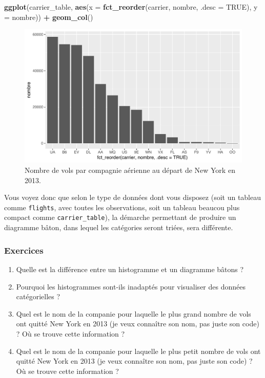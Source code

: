 \documentclass[a4paperpaper,]{article}
\newenvironment{Shaded}{\begin{snugshade}}{\end{snugshade}}
\newcommand{\KeywordTok}[1]{\textcolor[rgb]{0.13,0.29,0.53}{\textbf{#1}}}
\newcommand{\DataTypeTok}[1]{\textcolor[rgb]{0.13,0.29,0.53}{#1}}
\newcommand{\StringTok}[1]{\textcolor[rgb]{0.31,0.60,0.02}{#1}}
\newcommand{\OtherTok}[1]{\textcolor[rgb]{0.56,0.35,0.01}{#1}}
\newcommand{\OperatorTok}[1]{\textcolor[rgb]{0.81,0.36,0.00}{\textbf{#1}}}
\newcommand{\NormalTok}[1]{#1}
\providecommand{\tightlist}{%
  \setlength{\itemsep}{0pt}\setlength{\parskip}{0pt}}
\theoremstyle{definition}
\theoremstyle{definition}
\theoremstyle{definition}
\theoremstyle{remark}
\begin{document}
\begin{Shaded}
\begin{Highlighting}[]
\KeywordTok{ggplot}\NormalTok{(carrier_table, }\KeywordTok{aes}\NormalTok{(}\DataTypeTok{x =} \KeywordTok{fct_reorder}\NormalTok{(carrier, nombre, }\DataTypeTok{.desc =} \OtherTok{TRUE}\NormalTok{), }\DataTypeTok{y =}\NormalTok{ nombre)) }\OperatorTok{+}
\StringTok{  }\KeywordTok{geom_col}\NormalTok{()}
\end{Highlighting}
\end{Shaded}

\begin{figure}[htpb]

{\centering \includegraphics[width=0.9\linewidth]{figure/bpcarriersortedcol-1} 

}

\caption{Nombre de vols par compagnie aérienne au départ de New York en 2013.}\label{fig:bpcarriersortedcol}
\end{figure}

Vous voyez donc que selon le type de données dont vous disposez (soit un
tableau comme \texttt{flights}, avec toutes les observations, soit un
tableau beaucou plus compact comme \texttt{carrier\_table}), la démarche
permettant de produire un diagramme bâton, dans lequel les catégories
seront triées, sera différente.

\subsubsection{Exercices}\label{exercices-5}

\begin{enumerate}
\def\labelenumi{\arabic{enumi}.}
\tightlist
\item
  Quelle est la différence entre un histogramme et un diagramme bâtons ?
\item
  Pourquoi les histogrammes sont-ils inadaptés pour visualiser des
  données catégorielles ?
\item
  Quel est le nom de la companie pour laquelle le plus grand nombre de
  vols ont quitté New York en 2013 (je veux connaître son nom, pas juste
  son code) ? Où se trouve cette information ?
\item
  Quel est le nom de la companie pour laquelle le plus petit nombre de
  vols ont quitté New York en 2013 (je veux connaître son nom, pas juste
  son code) ? Où se trouve cette information ?
\end{enumerate}
\end{document}
